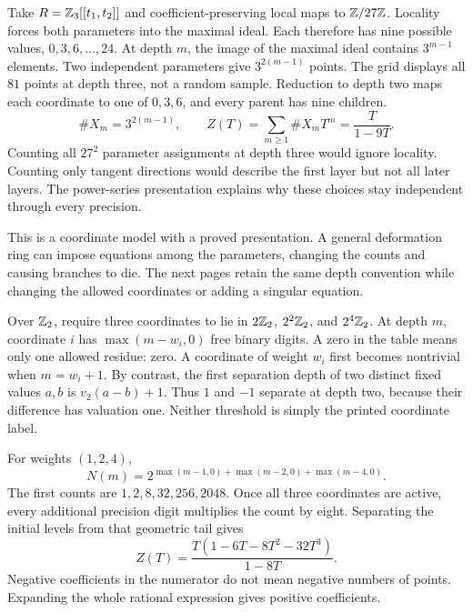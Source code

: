 Take $R=\mathbb Z_3[[t_1,t_2]]$ and coefficient-preserving local maps to $\mathbb Z/27\mathbb Z$. Locality forces both parameters into the maximal ideal. Each therefore has nine possible values, $0,3,6,\ldots,24$.
At depth $m$, the image of the maximal ideal contains $3^{m-1}$ elements. Two independent parameters give $3^{2(m-1)}$ points. The grid displays all $81$ points at depth three, not a random sample. Reduction to depth two maps each coordinate to one of $0,3,6$, and every parent has nine children.
\[
\#X_m=3^{2(m-1)},\qquad
Z(T)=\sum_{m\ge1}\#X_mT^m=\frac{T}{1-9T}.
\]
Counting all $27^2$ parameter assignments at depth three would ignore locality. Counting only tangent directions would describe the first layer but not all later layers. The power-series presentation explains why these choices stay independent through every precision.

This is a coordinate model with a proved presentation. A general deformation ring can impose equations among the parameters, changing the counts and causing branches to die. The next pages retain the same depth convention while changing the allowed coordinates or adding a singular equation.

Over $\mathbb Z_2$, require three coordinates to lie in $2\mathbb Z_2$, $2^2\mathbb Z_2$, and $2^4\mathbb Z_2$. At depth $m$, coordinate $i$ has $\max(m-w_i,0)$ free binary digits. A zero in the table means only one allowed residue: zero.
A coordinate of weight $w_i$ first becomes nontrivial when $m=w_i+1$. By contrast, the first separation depth of two distinct fixed values $a,b$ is $v_2(a-b)+1$. Thus $1$ and $-1$ separate at depth two, because their difference has valuation one. Neither threshold is simply the printed coordinate label.

For weights $(1,2,4)$,
\[
N(m)=2^{\max(m-1,0)+\max(m-2,0)+\max(m-4,0)}.
\]
The first counts are $1,2,8,32,256,2048$. Once all three coordinates are active, every additional precision digit multiplies the count by eight. Separating the initial levels from that geometric tail gives
\[
Z(T)=\frac{T(1-6T-8T^2-32T^3)}{1-8T}.
\]
Negative coefficients in the numerator do not mean negative numbers of points. Expanding the whole rational expression gives positive coefficients.

